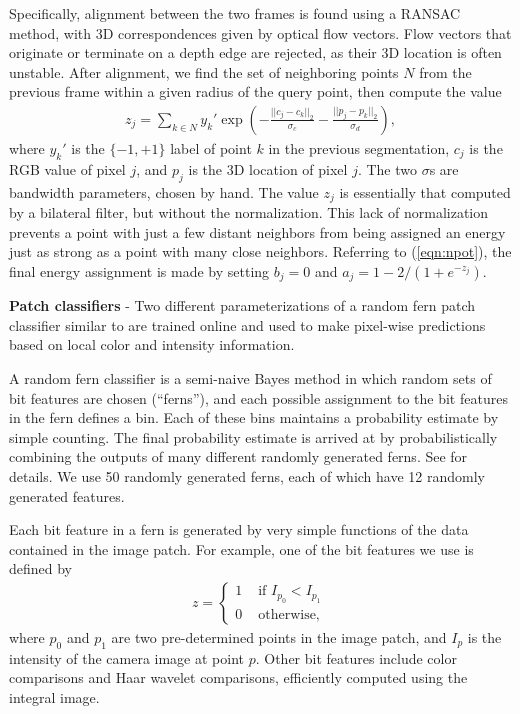 \documentclass[journal]{IEEEtran}
\begin{document}
Specifically, alignment between the two frames is found using a RANSAC method, with 3D correspondences given by optical flow vectors.  Flow vectors that originate or terminate on a depth edge are rejected, as their 3D location is often unstable.  After alignment, we find the set of neighboring points $N$ from the previous frame within a given radius of the query point, then compute the value
\begin{align*}
  z_j = \sum_{k \in N} y_k' \exp \left(-\frac{||c_j - c_k||_2}{\sigma_c} - \frac{||p_j - p_k||_2}{\sigma_d} \right),
\end{align*}
where $y_k'$ is the $\{-1, +1\}$ label of point $k$ in the previous segmentation, $c_j$ is the RGB value of pixel $j$, and $p_j$ is the 3D location of pixel $j$. The two $\sigma$s are bandwidth parameters, chosen by hand.  The value $z_j$ is essentially that computed by a bilateral filter, but without the normalization.  This lack of normalization prevents a point with just a few distant neighbors from being assigned an energy just as strong as a point with many close neighbors. Referring to (\ref{eqn:npot}), the final energy assignment is made by setting $b_j = 0$ and $a_j = 1 - 2 / (1 + e^{-z_j})$.

\textbf{Patch classifiers} - Two different parameterizations of a random fern patch classifier similar to \cite{ozuysal2007a} are trained online and used to make pixel-wise predictions based on local color and intensity information.

A random fern classifier is a semi-naive Bayes method in which random sets of bit features are chosen (``ferns''), and each possible assignment to the bit features in the fern defines a bin.  Each of these bins maintains a probability estimate by simple counting.  The final probability estimate is arrived at by probabilistically combining the outputs of many different randomly generated ferns.  See \cite{ozuysal2007a} for details.  We use 50 randomly generated ferns, each of which have 12 randomly generated features.

Each bit feature in a fern is generated by very simple functions of the data contained in the image patch.  For example, one of the bit features we use is defined by
\begin{align*}
  z =
  \left\{
  \begin{array}{rl}
    1 & \mbox{ if } I_{p_0} < I_{p_1} \\
    0 & \mbox{ otherwise, }
  \end{array}
  \right.
\end{align*}
where $p_0$ and $p_1$ are two pre-determined points in the image patch, and $I_p$ is the intensity of the camera image at point $p$.  Other bit features include color comparisons and Haar wavelet comparisons, efficiently computed using the integral image.
\end{document}
